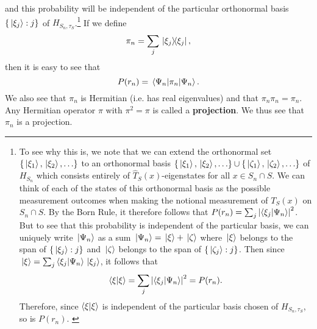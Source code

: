  and this probability will be independent of the particular orthonormal basis  $\{\ket*{\xi_j}:j\}$ of $H_{S_n,\tau_S}$.\footnote{To see why this is, we note that we can extend the orthonormal set $\{\ket*{\xi_1},\ket*{\xi_2},\ldots\}$ to an orthonormal basis  $\{\ket*{\xi_1},\ket*{\xi_2},\ldots\}\cup\{\ket*{\zeta_1},\ket*{\zeta_2},\ldots\}$ of $H_{S_n}$ which consists entirely of $\hat{T}_S(x)$-eigenstates for all $x\in S_n\cap S$. We can think of each of the states of this orthonormal basis as the possible measurement outcomes when making the notional measurement of $T_S(x)$ on $S_n\cap S$. By the Born Rule, it therefore follows that $P(r_n)=\sum_j \abs{ \ip{\xi_j}{\Psi_n}}^2$. But to see that this probability is independent of the particular basis, we can uniquely write $\ket*{\Psi_n}$ as a sum $\ket*{\Psi_n}=\ket*{\xi}+\ket*{\zeta}$ where $\ket*{\xi}$ belongs to the span of $\{\ket*{\xi_j}:j\}$ and $\ket*{\zeta}$ belongs to the span of $\{\ket*{\zeta_j}:j\}$.  Then since $\ket*{\xi}=\sum_j\ip{\xi_j}{\Psi_n}\ket*{\xi_j}$, it follows that $$\ip{\xi}{\xi}=\sum_j\abs{ \ip{\xi_j}{\Psi_n}}^2=P(r_n).$$ Therefore, since  $\ip{\xi}{\xi}$ is independent of the particular basis chosen of $H_{S_n,\tau_S}$, so is $P(r_n)$.  \label{priproof} } If we define 
\begin{equation}\label{tauprojection}
\pi_n=\sum_j\dyad*{\xi_j},
\end{equation}%
%
then it is easy to see that
\begin{equation}\label{Prn}
	P(r_n)=\ev*{\pi_n}{\Psi_n}.
\end{equation}
We also see that $\pi_n$ is Hermitian (i.e. has real eigenvalues) and that $\pi_n \pi_n = \pi_n$. Any Hermitian operator $\pi$ with $\pi^2=\pi$ is called a \textbf{projection}. We thus see that $\pi_n$ is a projection.

